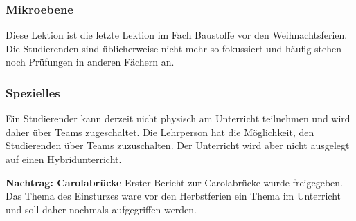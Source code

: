 \documentclass[
11pt,
captions=tableheading,
headsepline,
footsepline, 
captions=tableheading,
parskip=half-,
]{scrartcl}
\begin{document}
\subsubsection{Mikroebene}
Diese Lektion ist die letzte Lektion im Fach Baustoffe vor den Weihnachtsferien. 
Die Studierenden sind üblicherweise nicht mehr so fokussiert und häufig stehen noch Prüfungen in anderen Fächern an. 

\subsubsection{Spezielles}
Ein Studierender kann derzeit nicht physisch am Unterricht teilnehmen und wird daher über Teams zugeschaltet. 
Die Lehrperson hat die Möglichkeit, den Studierenden über Teams zuzuschalten. 
Der Unterricht wird aber nicht ausgelegt auf einen Hybridunterricht.


\textbf{Nachtrag: Carolabrücke}
Erster Bericht zur Carolabrücke wurde freigegeben. 
Das Thema des Einsturzes ware vor den Herbstferien ein Thema im Unterricht und soll daher nochmals aufgegriffen werden.
\end{document}
